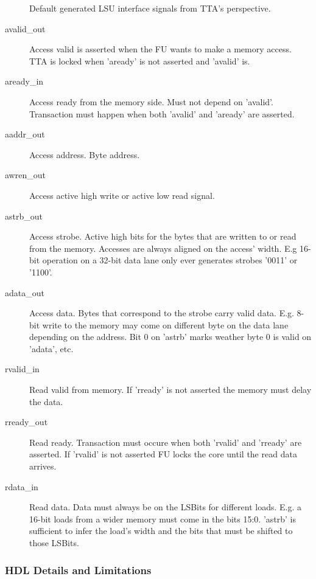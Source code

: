 \documentclass[a4paper,twoside]{tceusermanual}
\begin{document}
\begin{figure}[tbh]
\centerline{}
\caption{Default generated LSU interface signals from TTA's perspective.}
\label{fig:default_lsu32_iface}
\end{figure}

\begin{description}
\item[avalid\_out] Access valid is asserted when the FU wants to make
  a memory access. TTA is locked when 'aready' is not asserted and
  'avalid' is.
\item[aready\_in] Access ready from the memory side. Must not depend
  on 'avalid'. Transaction must happen when both 'avalid' and 'aready'
  are asserted.
\item[aaddr\_out] Access address. Byte address.
\item[awren\_out] Access active high write or active low read signal.
\item[astrb\_out] Access strobe. Active high bits for the bytes that
  are written to or read from the memory. Accesses are always aligned
  on the access' width. E.g 16-bit operation on a 32-bit data lane
  only ever generates strobes '0011' or '1100'.
\item[adata\_out] Access data. Bytes that correspond to the strobe
  carry valid data. E.g. 8-bit write to the memory may come on
  different byte on the data lane depending on the address. Bit 0 on
  'astrb' marks weather byte 0 is valid on 'adata', etc.
\item[rvalid\_in] Read valid from memory. If 'rready' is not asserted
  the memory must delay the data.
\item[rready\_out] Read ready. Transaction must occure when both
  'rvalid' and 'rready' are asserted. If 'rvalid' is not asserted FU
  locks the core until the read data arrives.
\item[rdata\_in] Read data. Data must always be on the LSBits for
  different loads. E.g. a 16-bit loads from a wider memory must come
  in the bits 15:0. 'astrb' is sufficient to infer the load's width
  and the bits that must be shifted to those LSBits.
\end{description}



\subsubsection{HDL Details and Limitations}
\end{document}

